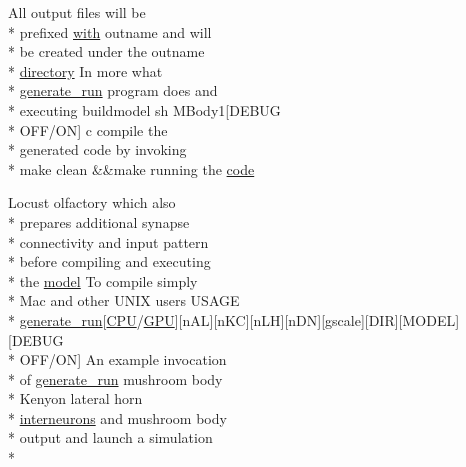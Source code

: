 \begin{DoxyCompactItemize}
All output files will be \\*
prefixed \hyperlink{userproject_2OneComp__project_2README_8txt_ace09bb40fbf4457ad9a9340a67a4fa9a}{with} outname and will \\*
be created under the outname \\*
\hyperlink{README_8txt_ae619b68020535fba5ac79522a0d9d1c4}{directory} In more what \\*
\hyperlink{userproject_2MBody__userdef__project_2README_8txt_a320a215d1e27b4de394be70e90d22863}{generate\+\_\+run} program does and \\*
executing buildmodel sh M\+Body1\mbox{[}D\+E\+B\+U\+G \\*
O\+F\+F/O\+N\mbox{]} c compile the \\*
generated code by invoking \\*
make clean \&\&make running the \hyperlink{userproject_2MBody1__project_2README_8txt_aecf2b086d6bbaf184edb53c042023d93}{code}
\item 
Locust olfactory which also \\*
prepares additional synapse \\*
connectivity and input pattern \\*
before compiling and executing \\*
the \hyperlink{README_8txt_a69fd801b7213948c12d9dd7eebb3ed14}{model} To compile simply \\*
Mac and other U\+N\+I\+X users U\+S\+A\+G\+E \\*
\hyperlink{userproject_2MBody__userdef__project_2README_8txt_a320a215d1e27b4de394be70e90d22863}{generate\+\_\+run}\mbox{[}\hyperlink{README_8txt_a74a069e3c75797de2636c4dd14daa147}{C\+P\+U}/\hyperlink{modelSpec_8h_a39cb9803524b6f3b783344b2f89867b4}{G\+P\+U}\mbox{]}\mbox{[}n\+A\+L\mbox{]}\mbox{[}n\+K\+C\mbox{]}\mbox{[}n\+L\+H\mbox{]}\mbox{[}n\+D\+N\mbox{]}\mbox{[}gscale\mbox{]}\mbox{[}D\+I\+R\mbox{]}\mbox{[}M\+O\+D\+E\+L\mbox{]}\mbox{[}D\+E\+B\+U\+G \\*
O\+F\+F/O\+N\mbox{]} An example invocation \\*
of \hyperlink{userproject_2MBody__userdef__project_2README_8txt_a320a215d1e27b4de394be70e90d22863}{generate\+\_\+run} mushroom body \\*
Kenyon lateral horn \\*
\hyperlink{userproject_2SynDelay__project_2README_8txt_adf6327d22e2c11a62a22ab5afd4f2b81}{interneurons} and mushroom body \\*
output and launch a simulation \\*

\end{DoxyCompactItemize}
